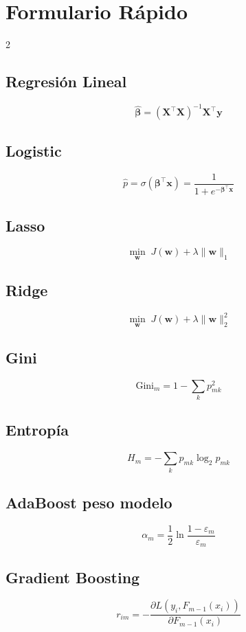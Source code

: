 \documentclass[12pt, a4paper]{article}
\begin{document}
\appendix
\section{Formulario Rápido}

\begin{multicols}{2}
	\subsection*{Regresión Lineal}
	\[
		\hat{\bm{\beta}} = (\mathbf{X}^\top\mathbf{X})^{-1}\mathbf{X}^\top\mathbf{y}
	\]

	\subsection*{Logistic}
	\[
		\hat{p} = \sigma(\bm{\beta}^\top\mathbf{x}) = \frac{1}{1+e^{-\bm{\beta}^\top\mathbf{x}}}
	\]

	\subsection*{Lasso}
	\[
		\min_{\mathbf{w}}\; J(\mathbf{w}) + \lambda\|\mathbf{w}\|_1
	\]

	\subsection*{Ridge}
	\[
		\min_{\mathbf{w}}\; J(\mathbf{w}) + \lambda\|\mathbf{w}\|_2^2
	\]

	\subsection*{Gini}
	\[
		\text{Gini}_m = 1 - \sum_k p_{mk}^2
	\]

	\subsection*{Entropía}
	\[
		H_m = -\sum_k p_{mk}\log_2 p_{mk}
	\]

	\subsection*{AdaBoost peso modelo}
	\[
		\alpha_m = \frac{1}{2}\ln\frac{1-\varepsilon_m}{\varepsilon_m}
	\]

	\subsection*{Gradient Boosting}
	\[
		r_{im} = -\frac{\partial L(y_i, F_{m-1}(x_i))}{\partial F_{m-1}(x_i)}
	\]


\end{multicols}
\end{document}
